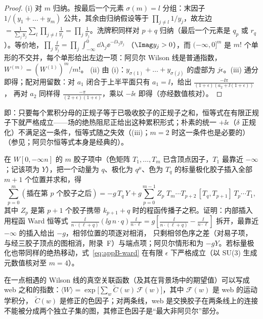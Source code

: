 \begin{proof}
(i) 对 $m$ 归纳。按最后一个元素 $\sigma(m)=l$ 分组：末因子 $1/(y_1+\dots+y_m)$ 公共，其余由归纳假设等于 $\prod_{j\ne l}1/y_j$，故左边
$=\frac{1}{\sum_jy_j}\sum_l\prod_{j\ne l}\frac1{y_j}=\prod_j\frac1{y_j}$。洗牌积同样对 $p+q$ 归纳（最后一个元素是 $q_p$ 或 $r_q$）。等价地，$\prod_j\frac{\ii}{y_j}=\prod_j\int_{-\infty}^0\dd\lambda_j\ee^{-\ii\lambda_jy_j}$
（$\Imag y_j>0$），而 $(-\infty,0]^m$ 是 $m!$ 个单形的不交并，每个单形给出左边一项：阿贝尔 Wilson 线是普通指数，$W^{(m)}=(W^{(1)})^m/m!$。
(ii) 由 (i)：$y_{\sigma(1)}+\dots+y_{\sigma(j)}$ 的虚部为 $j\epsilon$。(iii) 通分即得；配对用留数：对 $a_1$ 闭合于上半平面只有 $a_1=\ii$，给出 $\frac{-\ii\pi}{(1+\epsilon)(a_2+\ii(1+\epsilon))}$，
再对 $a_2$ 同样得 $\frac{-\pi}{(2+\epsilon)(1+\epsilon)}$，乘以 $-\ii\epsilon$ 即得（亦经数值核对）。%
\end{proof}

即：只要每个累积分母的正规子等于已吸收胶子的正规子之和，恒等式在有限正规子下就严格成立——场的绝热阻尼正给出这种累积形式；朴素的统一 $+\ii\epsilon$（$\delta$ 正规化）不满足这一条件，恒等式随之失效（(iii)；$m=2$ 时这一条件也是必要的）
（参见\cite[式~(5)--(6)]{Echevarria:2015byo}；阿贝尔恒等式本身是经典的）。

\begin{remark}\label{rem:appB-ward}
在 $W[0,-\infty n]$ 的 $m$ 胶子项中（色矩阵 $T_1,\dots,T_m$ 已含顶点因子，$T_1$ 最靠近 $-\infty$；记该项为 $Y$），把一个动量为 $q$、极化为 $q^\mu$、色为 $T_q$ 的标量极化胶子插入全部 $m+1$ 个位置并求和，得
\begin{equation}\label{eq:appB-ward}
\sum_{p=0}^{m}(\text{插在第 }p\text{ 个胶子之后})=-g\,T_q\,Y+g\sum_{p=0}^{m-1}Z_p\;T_m\cdots T_{p+2}\,[T_q,T_{p+1}]\,T_p\cdots T_1 ,
\end{equation}
其中 $Z_p$ 是第 $p+1$ 个胶子携带 $k_{p+1}+q$ 时的程函传播子之积。证明：内部插入用程函 Ward 恒等式
$\frac{\ii}{n\cdot(\ell+q)}(\ii g\,n\cdot q)\frac{\ii}{n\cdot\ell}=g[\frac{\ii}{n\cdot(\ell+q)}-\frac{\ii}{n\cdot\ell}]$ 拆开，最靠近 $-\infty$ 的插入给出 $-g$，相邻位置的项逐对相消，
只剩相邻色序之差（对易子项，与经三胶子顶点的图相消，附录~F）与端点项；阿贝尔情形和为 $-gY$。若标量极化也带同样的绝热移动，式~\eqref{eq:appB-ward} 在有限 $\epsilon$ 下严格成立（以 SU(3) 生成元数值核对至 $m=4$）。%
\end{remark}

\begin{proposition}\label{prop:appB-webs}
在一点相遇的 Wilson 线的真空关联函数（及其在背景场中的期望值）可以写成 web 之和的指数：$\langle W\rangle=\exp\big[\sum_w\tilde C(w)\,\mathcal F(w)\big]$，其中 $\mathcal F(w)$ 是 web 的运动学积分，
$\tilde C(w)$ 是修正的色因子；对两条线，web 是交换胶子在两条线上的连接不能被分成两个独立子集的图，其修正色因子是“最大非阿贝尔”部分\cite{Gatheral1983,FrenkelTaylor1984}。
\end{proposition}

